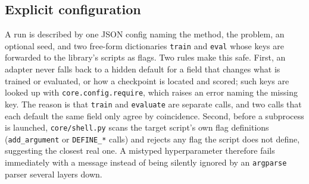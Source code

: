 \subsection{Explicit configuration}

A run is described by one JSON config naming the method, the problem, an
optional seed, and two free-form dictionaries \texttt{train} and
\texttt{eval} whose keys are forwarded to the library's scripts as flags.
Two rules make this safe. First, an adapter never falls back to a hidden
default for a field that changes what is trained or evaluated, or how a
checkpoint is located and scored; such keys are looked up with
\texttt{core.config.require}, which raises an error naming the missing key.
The reason is that \texttt{train} and \texttt{evaluate} are separate calls,
and two calls that each default the same field only agree by coincidence.
Second, before a subprocess is launched, \texttt{core/shell.py} scans the
target script's own flag definitions (\texttt{add\_argument} or
\texttt{DEFINE\_*} calls) and rejects any flag the script does not define,
suggesting the closest real one. A mistyped hyperparameter therefore fails
immediately with a message instead of being silently ignored by an
\texttt{argparse} parser several layers down.
